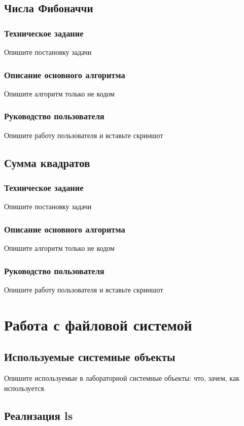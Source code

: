 \documentclass[a4paper,14pt]{extarticle}
\begin{document}
\subsection{Числа Фибоначчи}
\subsubsection{Техническое задание}
Опишите постановку задачи

\subsubsection{Описание основного алгоритма}
Опишите алгоритм только не кодом

\subsubsection{Руководство пользователя}
Опишите работу пользователя и вставьте скриншот

\subsection{Сумма квадратов}
\subsubsection{Техническое задание}
Опишите постановку задачи

\subsubsection{Описание основного алгоритма}
Опишите алгоритм только не кодом

\subsubsection{Руководство пользователя}
Опишите работу пользователя и вставьте скриншот
\newpage

\section{Работа с файловой системой}
\subsection{Используемые системные объекты}
Опишите используемые в лабораторной системные объекты: что, зачем, как используется.

\subsection{Реализация ls}
\end{document}
